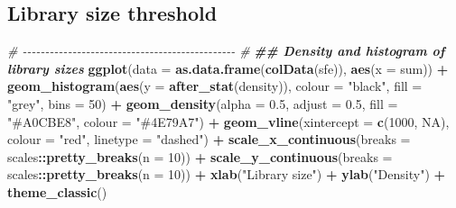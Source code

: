 \documentclass[
]{book}
\newenvironment{Shaded}{\begin{snugshade}}{\end{snugshade}}
\newcommand{\AttributeTok}[1]{\textcolor[rgb]{0.13,0.29,0.53}{#1}}
\newcommand{\CommentTok}[1]{\textcolor[rgb]{0.56,0.35,0.01}{\textit{#1}}}
\newcommand{\ConstantTok}[1]{\textcolor[rgb]{0.56,0.35,0.01}{#1}}
\newcommand{\DecValTok}[1]{\textcolor[rgb]{0.00,0.00,0.81}{#1}}
\newcommand{\DocumentationTok}[1]{\textcolor[rgb]{0.56,0.35,0.01}{\textbf{\textit{#1}}}}
\newcommand{\FloatTok}[1]{\textcolor[rgb]{0.00,0.00,0.81}{#1}}
\newcommand{\FunctionTok}[1]{\textcolor[rgb]{0.13,0.29,0.53}{\textbf{#1}}}
\newcommand{\NormalTok}[1]{#1}
\newcommand{\SpecialCharTok}[1]{\textcolor[rgb]{0.81,0.36,0.00}{\textbf{#1}}}
\newcommand{\StringTok}[1]{\textcolor[rgb]{0.31,0.60,0.02}{#1}}
\begin{document}
\hypertarget{library-size-threshold}{%
\subsection{Library size threshold}\label{library-size-threshold}}

\begin{Shaded}
\begin{Highlighting}[]
\CommentTok{\# {-}{-}{-}{-}{-}{-}{-}{-}{-}{-}{-}{-}{-}{-}{-}{-}{-}{-}{-}{-}{-}{-}{-}{-}{-}{-}{-}{-}{-}{-}{-}{-}{-}{-}{-}{-}{-}{-}{-}{-}{-}{-}{-}{-}{-}{-}{-} \#}
\DocumentationTok{\#\# Density and histogram of library sizes}
\FunctionTok{ggplot}\NormalTok{(}\AttributeTok{data =} \FunctionTok{as.data.frame}\NormalTok{(}\FunctionTok{colData}\NormalTok{(sfe)),}
       \FunctionTok{aes}\NormalTok{(}\AttributeTok{x =}\NormalTok{ sum)) }\SpecialCharTok{+}
    \FunctionTok{geom\_histogram}\NormalTok{(}\FunctionTok{aes}\NormalTok{(}\AttributeTok{y =} \FunctionTok{after\_stat}\NormalTok{(density)), }
                   \AttributeTok{colour =} \StringTok{"black"}\NormalTok{, }
                   \AttributeTok{fill =} \StringTok{"grey"}\NormalTok{,}
                   \AttributeTok{bins =} \DecValTok{50}\NormalTok{) }\SpecialCharTok{+}
    \FunctionTok{geom\_density}\NormalTok{(}\AttributeTok{alpha =} \FloatTok{0.5}\NormalTok{,}
                 \AttributeTok{adjust =} \FloatTok{0.5}\NormalTok{,}
                 \AttributeTok{fill =} \StringTok{"\#A0CBE8"}\NormalTok{,}
                 \AttributeTok{colour =} \StringTok{"\#4E79A7"}\NormalTok{) }\SpecialCharTok{+}
    \FunctionTok{geom\_vline}\NormalTok{(}\AttributeTok{xintercept =} \FunctionTok{c}\NormalTok{(}\DecValTok{1000}\NormalTok{, }\ConstantTok{NA}\NormalTok{),}
               \AttributeTok{colour =} \StringTok{"red"}\NormalTok{, }
               \AttributeTok{linetype =} \StringTok{"dashed"}\NormalTok{) }\SpecialCharTok{+} 
    \FunctionTok{scale\_x\_continuous}\NormalTok{(}\AttributeTok{breaks =}\NormalTok{ scales}\SpecialCharTok{::}\FunctionTok{pretty\_breaks}\NormalTok{(}\AttributeTok{n =} \DecValTok{10}\NormalTok{)) }\SpecialCharTok{+} 
    \FunctionTok{scale\_y\_continuous}\NormalTok{(}\AttributeTok{breaks =}\NormalTok{ scales}\SpecialCharTok{::}\FunctionTok{pretty\_breaks}\NormalTok{(}\AttributeTok{n =} \DecValTok{10}\NormalTok{)) }\SpecialCharTok{+} 
    \FunctionTok{xlab}\NormalTok{(}\StringTok{"Library size"}\NormalTok{) }\SpecialCharTok{+} 
    \FunctionTok{ylab}\NormalTok{(}\StringTok{"Density"}\NormalTok{) }\SpecialCharTok{+} 
    \FunctionTok{theme\_classic}\NormalTok{()}
\end{Highlighting}
\end{Shaded}
\end{document}
